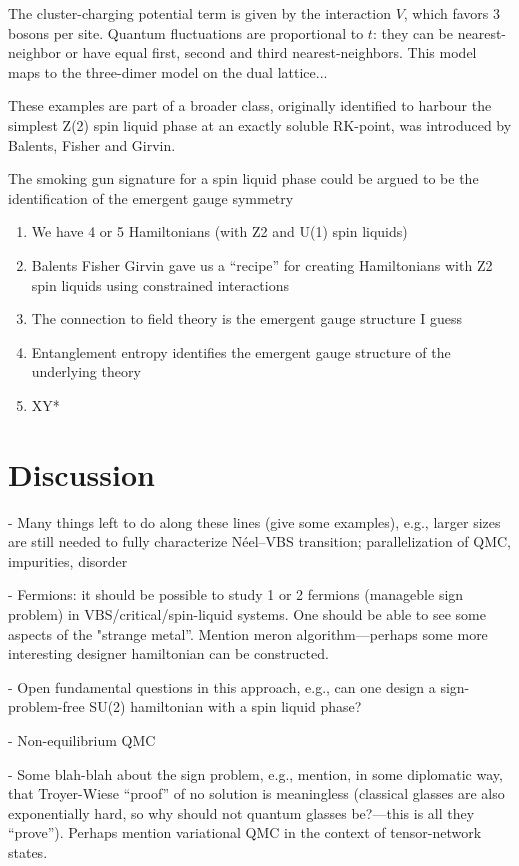 \documentclass[aps,prb,groupedaddress,twocolumn]{revtex4}
\begin{document}
The cluster-charging potential term is given by the interaction $V$, which favors 3 bosons per site.  Quantum fluctuations are proportional to $t$: they can be nearest-neighbor\cite{TopoEE} or have equal first, second and third nearest-neighbors\cite{Isakov1,Isakov2}.  This model maps to the three-dimer model on the dual lattice...

These examples are part of a broader class, originally identified to harbour the simplest Z(2) spin liquid phase at an exactly soluble RK-point, was introduced by Balents, Fisher and Girvin.\cite{BFG}  


The smoking gun signature for a spin liquid phase could be argued to be the identification of the emergent gauge symmetry


\begin{enumerate}
\item We have 4 or 5 Hamiltonians (with Z2 \cite{Isakov1} and U(1) spin liquids)
\item Balents Fisher Girvin gave us a ``recipe'' for creating Hamiltonians with Z2 spin liquids using constrained interactions
\item The connection to field theory is the emergent gauge structure I guess
\item Entanglement entropy identifies the emergent gauge structure of the underlying theory
\item XY*
\end{enumerate}

\section{Discussion}
- Many things left to do along these lines (give some examples), e.g., larger sizes are still needed
to fully characterize N\'eel--VBS transition; parallelization of QMC, impurities, disorder

- Fermions: it should be possible to study 1 or 2 fermions (manageble sign problem) in 
VBS/critical/spin-liquid systems. One should be able to see some aspects of the "strange metal''.
Mention meron algorithm---perhaps some more interesting designer hamiltonian can be constructed.

- Open fundamental questions in this approach, e.g., can one design a sign-problem-free
  SU(2) hamiltonian with a spin liquid phase?

- Non-equilibrium QMC

- Some blah-blah about the sign problem, e.g., mention, in some diplomatic way, that Troyer-Wiese ``proof'' of no 
solution is meaningless (classical glasses are also exponentially hard, so why should not quantum glasses be?---this
is all they ``prove''). Perhaps mention variational QMC in the context of tensor-network states.


\end{document}
